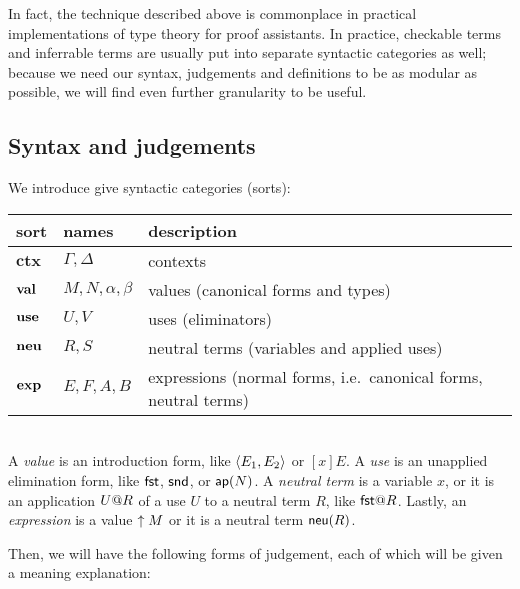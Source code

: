 \documentclass[main.tex]{subfiles}
\begin{document}
In fact, the technique described above is commonplace in practical
implementations of type theory for proof assistants. In practice,
checkable terms and inferrable terms are usually put into separate
syntactic categories as well; because we need our syntax, judgements
and definitions to be as modular as possible, we will find even
further granularity to be useful.

\subsection{Syntax and judgements}

We introduce give syntactic categories (sorts):\\

\begin{tabular}{lll}
  \toprule
  sort & names & description\\ \midrule
  $\mathbf{ctx}$ & $\Gamma, \Delta$ & contexts\\
  $\mathbf{val}$ & $M, N, \alpha, \beta$ & values (canonical forms and types) \\
  $\mathbf{use}$ & $U, V$ & uses (eliminators) \\
  $\mathbf{neu}$ & $R, S$ & neutral terms (variables and applied uses) \\
  $\mathbf{exp}$ & $E,F,A,B$ & expressions (normal forms, i.e.\ canonical forms, neutral terms)\\
  \bottomrule
\end{tabular}\\

A \emph{value} is an introduction form, like $\langle E_1,E_2\rangle$ or
$[x]E$. A \emph{use} is an unapplied elimination form, like $\mathsf{fst}$,
$\mathsf{snd}$, or $\mathsf{ap}(N)$. A \emph{neutral term} is a variable $x$, or it
is an application $U@R$ of a use $U$ to a neutral term $R$,
like $\elim{\ufst}{R}$. Lastly, an \emph{expression} is a value $\uparrow M$ or it
is a neutral term $\mathsf{neu}(R)$.

Then, we will have the following forms of judgement, each of which
will be given a meaning explanation:\\
\end{document}

